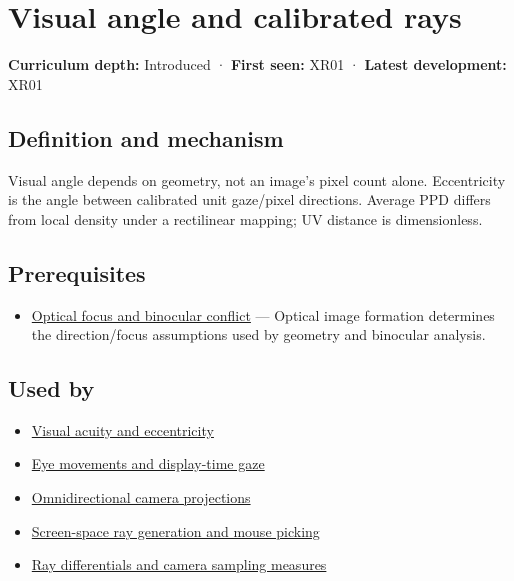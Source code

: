 \hypertarget{appendix-7d356c396d1a}{}\label{referencestart:appendix-7d356c396d1a}
\section{Visual angle and calibrated rays}\label{appendix-7d356c396d1a-visual-angle-and-calibrated-rays}

\textbf{Curriculum depth:} Introduced · \textbf{First seen:} XR01 · \textbf{Latest development:} XR01

\begin{allmightroledefinition}

\subsection{Definition and mechanism}\label{appendix-7d356c396d1a-definition-and-mechanism}

Visual angle depends on geometry, not an image's pixel count alone. Eccentricity is the angle between calibrated unit gaze/pixel directions. Average PPD differs from local density under a rectilinear mapping; UV distance is dimensionless.

\end{allmightroledefinition}

\subsection{Prerequisites}\label{appendix-7d356c396d1a-prerequisites}

\begin{itemize}
\tightlist
\item
  \hyperref[appendix-f90cee1be7a4]{Optical focus and binocular conflict} --- Optical image formation determines the direction/focus assumptions used by geometry and binocular analysis.
\end{itemize}

\subsection{Used by}\label{appendix-7d356c396d1a-used-by}

\begin{itemize}
\item
  \hyperref[appendix-b491fc48c54b]{Visual acuity and eccentricity}
\item
  \hyperref[appendix-a6f2c4fe1996]{Eye movements and display-time gaze}
\item
  \hyperref[appendix-fc99ad39f351]{Omnidirectional camera projections}
\item
  \hyperref[appendix-f1a6d43e80d1]{Screen-space ray generation and mouse picking}
\item
  \hyperref[appendix-8c40fad29462]{Ray differentials and camera sampling measures}
\end{itemize}

